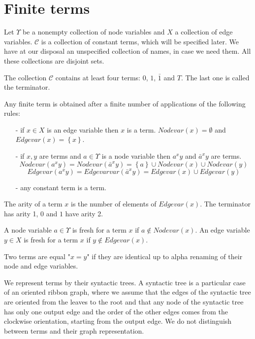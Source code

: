 \section{Finite terms}

Let $\Upsilon$ be a nonempty collection of node variables and $X$ a collection of edge variables. $\mathcal{C}$ is a collection of constant terms, which will be specified later. We have at our disposal an unspecified collection of names, in case we need them. All these collections are disjoint sets. 

The collection $\mathcal{C}$ contains at least four terms: $0$, $1$, $\displaystyle \bar{1}$ and $T$. The last one is called the terminator. 



\begin{definition}
Any finite term is obtained after a finite number of applications of the following rules:
\begin{enumerate}
\item[-] if $x \in X$ is an edge variable then $x$ is a term. $Nodevar(x)=\emptyset$ and $Edgevar(x)=\left\{ x \right\}$.
\item[-] if $x,y$ are terms and $a \in \Upsilon$ is a node variable then $\displaystyle a^{x}y$ and $\displaystyle \bar{a}^{x}y$  are terms. 
$$Nodevar\left( a^{x} y \right) = Nodevar\left( \bar{a}^{x} y \right) =  \left\{ a \right\} \cup Nodevar(x) \cup Nodevar(y)$$
$$Edgevar\left( a^{x} y \right) = Edgevarvar\left( \bar{a}^{x} y \right) = Edgevar(x) \cup Edgevar(y)$$
\item[-] any constant term is a term. 
\end{enumerate}

The arity of a term $x$ is the number of elements of $Edgevar(x)$. The terminator has arity 1, $0$ and $1$ have arity 2.

A node variable $a \in \Upsilon$ is fresh for a term $x$ if $\displaystyle a \not \in Nodevar(x)$. An edge variable $y \in X$ is fresh for a term  $x$  if 
$\displaystyle y \not \in Edgevar(x)$.

Two terms are equal "$x=y$" if they are identical up to alpha renaming of their node and edge variables. 
\label{defterms}
\end{definition}



We represent terms by their syntactic trees. A syntactic tree is a particular case of an oriented ribbon graph, where we assume that the edges of the syntactic tree are oriented from the leaves to the root and that any node of the syntactic tree has only one output edge and the order of the other edges comes from the clockwise orientation, starting from the output edge. We do not distinguish between terms and their graph representation. 





